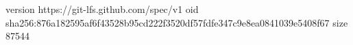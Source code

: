 version https://git-lfs.github.com/spec/v1
oid sha256:876a182595af6f43528b95cd222f3520df57fdfe347c9e8ea0841039e5408f67
size 87544
